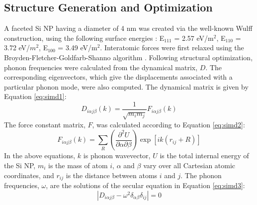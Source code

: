\subsection{Structure Generation and Optimization}
A faceted Si NP having a diameter of 4 nm was created via the well-known Wulff construction, using the following surface energies \cite{hong1998effect}: E$_{111}$ = 2.57 eV/m$^2$, E$_{110}$ = 3.72 eV/$m^2$, E$_{100}$ = 3.49 eV/m$^2$. Interatomic forces were first relaxed using the Broyden-Fletcher-Goldfarb-Shanno algorithm \cite{fletcher2013practical}. Following structural optimization, phonon frequencies were calculated from the dynamical matrix, $D$. The corresponding eigenvectors, which give the displacements associated with a particular phonon mode, were also computed. The dynamical matrix is given by Equation \ref{eq:simd1}:
\begin{equation}\label{eq:simd1}
D_{i\alpha j\beta}(k) = \frac{1}{\sqrt{m_im_j}}F_{i\alpha j\beta}(k)
\end{equation}
The force constant matrix, $F$, was calculated according to Equation \ref{eq:simd2}:
\begin{equation}\label{eq:simd2}
F_{i\alpha j\beta}(k) = \sum_{R}\left(\frac{\partial^2U}{\partial\alpha\partial\beta}\right)\exp{\left[ik\left(r_{ij} + R\right)\right]}
\end{equation}
In the above equations, $k$ is phonon wavevector, $U$ is the total internal energy of the Si NP, $m_i$ is the mass of atom $i$, $\alpha$ and $\beta$ vary over all Cartesian atomic coordinates, and $r_{ij}$ is the distance between atoms $i$ and $j$. The phonon frequencies, $\omega$, are the solutions of the secular equation in Equation \ref{eq:simd3}:
\begin{equation}\label{eq:simd3}
|D_{i\alpha j\beta} - \omega^2\delta_{\alpha\beta}\delta_{ij}| = 0
\end{equation}
